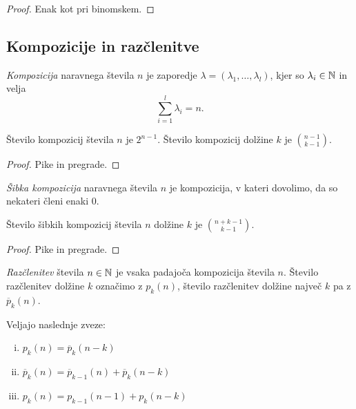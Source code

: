 \begin{proof}
Enak kot pri binomskem.
\end{proof}

\newpage

\subsection{Kompozicije in razčlenitve}

\begin{definicija}
\emph{Kompozicija} naravnega števila $n$ je
zaporedje $\lambda = (\lambda_1, \dots, \lambda_l)$, kjer so
$\lambda_i \in \mathbb{N}$ in velja
\[
\sum_{i=1}^l \lambda_i = n.
\]
\end{definicija}

\begin{trditev}
Število kompozicij števila $n$ je $2^{n-1}$. Število kompozicij
dolžine $k$ je $\binom{n-1}{k-1}$.
\end{trditev}

\begin{proof}
Pike in pregrade.
\end{proof}

\begin{definicija}
\emph{Šibka kompozicija} naravnega števila
$n$ je kompozicija, v kateri dovolimo, da so nekateri členi enaki
$0$.
\end{definicija}

\begin{trditev}
Število šibkih kompozicij števila $n$ dolžine $k$ je
$\binom{n+k-1}{k-1}$.
\end{trditev}

\begin{proof}
Pike in pregrade.
\end{proof}

\begin{definicija}
\emph{Razčlenitev} števila $n \in \mathbb{N}$ je vsaka
padajoča kompozicija števila $n$. Število razčlenitev dolžine $k$
označimo z $p_k(n)$, število razčlenitev dolžine največ $k$ pa z
$\overline{p}_k(n)$.
\end{definicija}

\begin{trditev}
Veljajo naslednje zveze:

\begin{enumerate}[i)]
\item $p_k(n) = \overline{p}_k(n-k)$
\item
$\overline{p}_k(n) = \overline{p}_{k-1}(n) + \overline{p}_k(n-k)$
\item $p_k(n) = p_{k-1}(n-1) + p_k(n-k)$
\end{enumerate}
\end{trditev}

